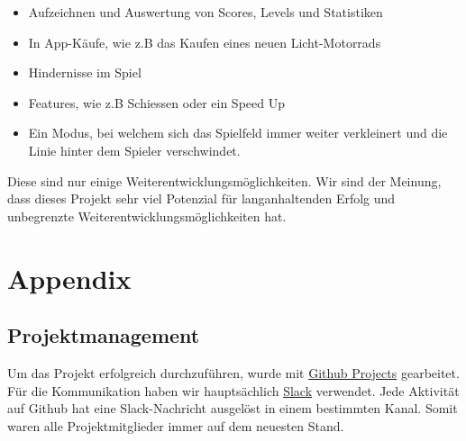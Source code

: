 \documentclass[11pt,ngerman]{article}
\begin{document}
    \begin{itemize}
	    \item Aufzeichnen und Auswertung von Scores, Levels und Statistiken
	    \item In App-Käufe, wie z.B das Kaufen eines neuen Licht-Motorrads
	    \item Hindernisse im Spiel
	    \item Features, wie z.B Schiessen oder ein Speed Up
		\item Ein Modus, bei welchem sich das Spielfeld immer weiter verkleinert und die Linie hinter dem Spieler verschwindet.
	\end{itemize}

	Diese sind nur einige Weiterentwicklungsmöglichkeiten. Wir sind der Meinung, dass dieses Projekt sehr viel Potenzial für langanhaltenden Erfolg und unbegrenzte Weiterentwicklungsmöglichkeiten hat.

    \section{Appendix}

    \subsection{Projektmanagement}
    Um das Projekt erfolgreich durchzuführen, wurde mit \hyperlink{https://github.com/features/project-management/}{Github Projects} gearbeitet. Für die Kommunikation haben wir hauptsächlich \hyperlink{https://slack.com/}{Slack} verwendet. Jede Aktivität auf Github hat eine Slack-Nachricht ausgelöst in einem bestimmten Kanal. Somit waren alle Projektmitglieder immer auf dem neuesten Stand.
\end{document}
